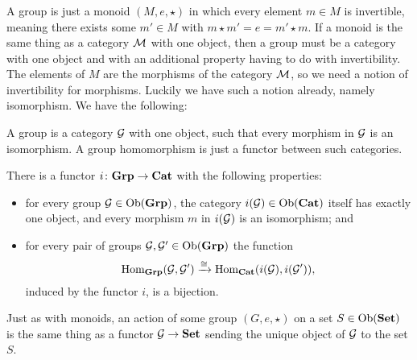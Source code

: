 
\subsubsection{}

A group is just a monoid $(M,e,\star)$ in which every element $m\in M$ is invertible, meaning there exists some $m'\in M$ with $m\star m'=e=m'\star m.$ If a monoid is the same thing as a category $\mathcal{M}$ with one object, then a group must be a category with one object and with an additional property having to do with invertibility. The elements of $M$ are the morphisms of the category $\mathcal{M}$, so we need a notion of invertibility for morphisms. Luckily we have such a notion already, namely isomorphism. We have the following:
\begin{slogan}
A group is a category $\mathcal{G}$ with one object, such that every morphism in $\mathcal{G}$ is an isomorphism. A group homomorphism is just a functor between such categories.
\end{slogan}

\begin{theorem}\label{thm:grp to cat}

There is a functor $i\colon{\bf Grp}\rightarrow{\bf Cat}$ with the following properties:
\begin{itemize}
\item for every group $\mathcal{G}\in\textnormal{Ob}({\bf Grp})$, the category $i(\mathcal{G})\in\textnormal{Ob}({\bf Cat})$ itself has exactly one object, and every morphism $m$ in $i(\mathcal{G})$ is an isomorphism; and 
\item for every pair of groups $\mathcal{G},\mathcal{G}'\in\textnormal{Ob}({\bf Grp})$ the function $$\textnormal{Hom}_{\bf Grp}(\mathcal{G},\mathcal{G}')\xrightarrow{\cong}\textnormal{Hom}_{\bf Cat}(i(\mathcal{G}),i(\mathcal{G}')),$$ induced by the functor $i$, is a bijection.
\end{itemize}

\end{theorem}

Just as with monoids, an action of some group $(G,e,\star)$ on a set $S\in\textnormal{Ob}({\bf Set})$ is the same thing as a functor $\mathcal{G}\rightarrow{\bf Set}$ sending the unique object of $\mathcal{G}$ to the set $S$. 


\subsubsection{}


